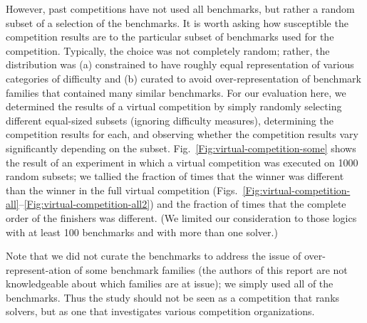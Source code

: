 \documentclass[smallcondensed]{svjour3}
\begin{document}
However, past competitions have not used all benchmarks, but rather a random subset of a selection of the benchmarks. It is worth asking how susceptible the competition results are to the particular subset of benchmarks used for the competition. Typically, the choice was not completely random; rather, the distribution was (a) constrained to have roughly equal representation of various categories of difficulty and (b) curated to avoid over-representation of benchmark families that contained many similar benchmarks. For our evaluation here, we determined the results of a virtual competition by simply randomly selecting different equal-sized subsets (ignoring difficulty measures), determining the competition results for each, and observing whether the competition results vary significantly depending on the subset.  Fig.~\ref{Fig:virtual-competition-some} shows the result of an experiment in which a virtual competition was executed on 1000 random subsets; we tallied the fraction of times that the winner was different than the winner in the full virtual competition (Figs.~\ref{Fig:virtual-competition-all}--\ref{Fig:virtual-competition-all2}) and the fraction of times that the complete order of the finishers was different. (We limited our consideration to those logics with at least 100 benchmarks and with more than one solver.)

Note that we did not curate the benchmarks to address the issue of over-represent-ation of some benchmark families (the authors of this report are not knowledgeable about which families are at issue); we simply used all of the benchmarks.  Thus the study should not be seen as a competition that ranks solvers, but as one that investigates various competition organizations.
\end{document}
